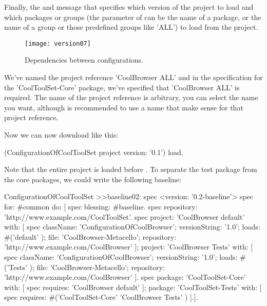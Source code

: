 \documentclass[a4paper,10pt,twoside]{book}
\begin{document}
Finally, the  and  message that specifies which version of the project to load and which packages or groups (the parameter of  can be the name of a package, or the name of a group or those predefined groups like 'ALL') to load from the project. 

\begin{figure}
\begin{center}
\texttt{[image: version07]}
\caption{Dependencies between configurations.\label{fig:version07}}
\end{center}
\end{figure} 


We've named the project reference 'CoolBrowser ALL' and in the specification for the 'CoolToolSet-Core' package, we've specified that 'CoolBrowser ALL' is required. The name of the project reference is arbitrary, you can select the name you want, although is recommended to use a name that make sense for that project reference. 

Now we can now download  like this:

\begin{code}{}
(ConfigurationOfCoolToolSet project version: '0.1') load.
\end{code}

Note that the entire  project is loaded before . To separate the test package from the core packages, we could write the following baseline:

\begin{code}{}
ConfigurationOfCoolToolSet >>baseline02: spec 
	<version: '0.2-baseline'>
	spec for: #common do: [
		spec blessing: #baseline.
		spec repository: 'http://www.example.com/CoolToolSet'.
		spec
			project: 'CoolBrowser default' with: [
				spec
					className: 'ConfigurationOfCoolBrowser';
					versionString: '1.0';
					loads: #('default' );
					file: 'CoolBrowser-Metacello';
					repository: 'http://www.example.com/CoolBrowser' ];
			project: 'CoolBrowser Tests' with: [
				spec
					className: 'ConfigurationOfCoolBrowser';
					versionString: '1.0';
					loads: #('Tests' );
					file: 'CoolBrowser-Metacello';
					repository: 'http://www.example.com/CoolBrowser' ].
		spec 
			package: 'CoolToolSet-Core' with: [ spec requires: 'CoolBrowser default' ];
			package: 'CoolToolSet-Tests' with: [ 
				spec requires: #('CoolToolSet-Core'  'CoolBrowser Tests'  ) ].].			
\end{code}
\end{document}
